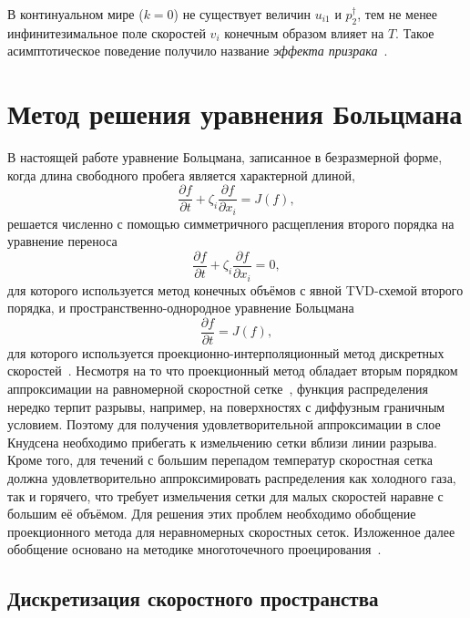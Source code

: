 \documentclass[
aps,%
12pt,%
final,%
notitlepage,%
oneside,%
onecolumn,%
nobibnotes,%
nofootinbib,%
superscriptaddress,%
noshowpacs,%
showkeys,%
tightenlines,%
centertags]%
{revtex4}
\newcommand{\pder}[2][]{\frac{\partial#1}{\partial#2}}
\begin{document}
В континуальном мире (\(k=0\)) не существует величин \(u_{i1}\) и \(p^\dag_2\),
тем не менее инфинитезимальное поле скоростей \(v_i\) конечным образом влияет на \(T\).
Такое асимптотическое поведение получило название \emph{эффекта призрака}~\cite{Sone2002, Sone2007}.

\section{Метод решения уравнения Больцмана}

В настоящей работе уравнение Больцмана, записанное в безразмерной форме,
когда длина свободного пробега является характерной длиной,
\begin{equation}\label{eq:split_transport}
    \pder[f]{t} + \zeta_i\pder[f]{x_i} = J(f),
\end{equation}
решается численно с помощью симметричного расщепления второго порядка на уравнение переноса
\begin{equation}\label{eq:split_transport}
    \pder[f]{t} + \zeta_i\pder[f]{x_i} = 0,
\end{equation}
для которого используется метод конечных объёмов с явной TVD-схемой второго порядка,
и пространственно-однородное уравнение Больцмана
\begin{equation}\label{eq:split_collisions}
    \pder[f]{t} = J(f),
\end{equation}
для которого используется проекционно-интерполяционный
метод дискретных скоростей~\cite{Tcheremissine1997, Tcheremissine2006, Dodulad2015}.
Несмотря на то что проекционный метод обладает вторым порядком аппроксимации
на равномерной скоростной сетке~\cite{Anikin2012},
функция распределения нередко терпит разрывы, например, на поверхностях с диффузным граничным условием.
Поэтому для получения удовлетворительной аппроксимации в слое Кнудсена необходимо прибегать
к измельчению сетки вблизи линии разрыва.
Кроме того, для течений с большим перепадом температур скоростная сетка должна удовлетворительно аппроксимировать
распределения как холодного газа, так и горячего, что требует измельчения сетки для малых скоростей
наравне с большим её объёмом.
Для решения этих проблем необходимо обобщение проекционного метода для неравномерных скоростных сеток.
Изложенное далее обобщение основано на методике многоточечного проецирования~\citep{Dodulad2012}.

\subsection{Дискретизация скоростного пространства}
\end{document}
